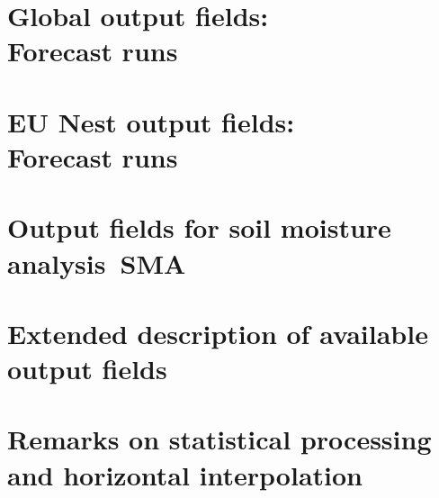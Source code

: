 \documentclass[a4paper,twoside,10pt,DIV13,BCOR=5mm]{scrbook}
\begin{document}






\chapter[Global output fields: Forecast runs]{Global output fields:\\ Forecast runs}



\chapter[EU Nest output fields: Forecast runs]{EU Nest output fields:\\ Forecast runs}
\label{nest:chap_forecast_runs}

%

\chapter{Output fields for soil moisture analysis~SMA}
\label{output_for_sma}



\chapter{Extended description of available output fields}




\chapter[Remarks on statistical processing and horizontal interpolation]{Remarks on statistical processing and horizontal interpolation}
\end{document}

